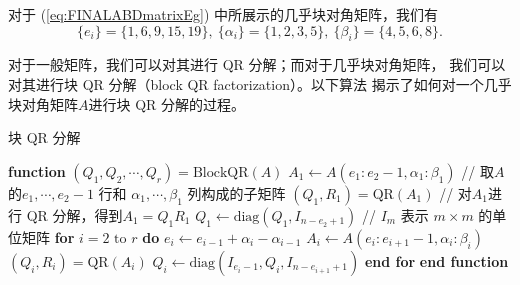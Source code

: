   \begin{exm}
    \label{exm:FINALABDmatrix}
    对于 (\ref{eq:FINALABDmatrixEg}) 中所展示的几乎块对角矩阵，我们有
    \begin{displaymath}
      \{e_{i}\}=\{1,6,9,15,19\},\
      \{\alpha_{i}\}=\{1,2,3,5\},\
      \{\beta_{i}\}=\{4,5,6,8\}.
    \end{displaymath}
  \end{exm}

  对于一般矩阵，我们可以对其进行 QR 分解；而对于几乎块对角矩阵，
  我们可以对其进行块 QR 分解（block QR factorization）。以下算法
  揭示了如何对一个几乎块对角矩阵$A$进行块 QR 分解的过程。

  \begin{algorithm}[htb]
  \caption{块 QR 分解}
  \label{alg:FINALblockQR}
  \begin{algorithmic}[1] 
    \STATE \textbf{function} $({Q}_{1},{Q}_{2},\cdots,{Q}_{r})= \text{BlockQR}(A)$
    \STATE \quad $A_{1}\leftarrow A(e_{1}:e_{2}-1,\alpha_{1}:\beta_{1})$
    \hfill
      // 取$A$的\( e_1,\cdots,  e_{2} - 1 \) 行和
      \( \alpha_1, \cdots, \beta_1 \) 列构成的子矩阵
    \STATE \quad $(Q_{1},R_{1})=\text{QR}(A_{1})$
    \hfill // 对$A_{1}$进行 QR 分解，得到$A_{1}=Q_{1}R_{1}$
    \STATE \quad  $Q_1 \leftarrow \text{diag}(Q_1, I_{n-e_{2}+1})$
    \hfill //  \( I_m \) 表示 \( m \times m \) 的单位矩阵
    \STATE \quad \textbf{for} {$i=2 \text{ to } r$} \textbf{do}
    \STATE \qquad \( e_i \leftarrow e_{i-1} + \alpha_i - \alpha_{i-1} \)
    \STATE \qquad $A_{i}\leftarrow A(e_{i}:e_{i+1}-1,\alpha_{i}:\beta_{i})$
    \STATE \qquad $(Q_{i},R_{i})=\text{QR}(A_{i})$
    \STATE \qquad $Q_i \leftarrow \text{diag}(I_{e_{i}-1}, Q_i, I_{n-e_{i+1}+1})$
    \STATE \quad \textbf{end for}
    \STATE \textbf{end function}
  \end{algorithmic}
  \end{algorithm}



